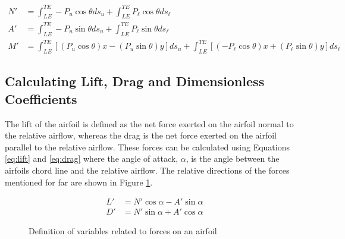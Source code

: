 \documentclass[runningheads]{llncs}
\begin{document}
\begin{align}
    N' &= \int_{LE}^{TE} -P_u\cos\theta ds_u + \int_{LE}^{TE} P_\ell\cos\theta ds_\ell
    \label{eq:normal_force}\\
    A' &= \int_{LE}^{TE} -P_u\sin\theta ds_u + \int_{LE}^{TE} P_\ell\sin\theta ds_\ell
    \label{eq:axial_force}\\
    M' &= \int_{LE}^{TE} \left[(P_u\cos\theta)x - (P_u\sin\theta)y\right]ds_u + \int_{LE}^{TE} \left[(-P_\ell\cos\theta)x + (P_\ell\sin\theta)y\right]ds_\ell
    \label{eq:leading_edge_moment}
\end{align}

\subsection{Calculating Lift, Drag and Dimensionless Coefficients}

The lift of the airfoil is defined as the net force exerted on the airfoil normal to the relative airflow, whereas the drag is the net force exerted on the airfoil parallel to the relative airflow. These forces can be calculated using Equations \ref{eq:lift} and \ref{eq:drag} where the angle of attack, $\alpha$, is the angle between the airfoils chord line and the relative airflow. The relative directions of the forces mentioned for far are shown in Figure \ref{fig:airfoil_directions}.

\begin{align}
    L' &= N'\cos\alpha - A'\sin\alpha \label{eq:lift} \\
    D' &= N'\sin\alpha + A'\cos\alpha \label{eq:drag}
\end{align}

\begin{figure}
    \centering
    \caption{Definition of variables related to forces on an airfoil}
    \label{fig:airfoil_directions}
\end{figure}
\end{document}
